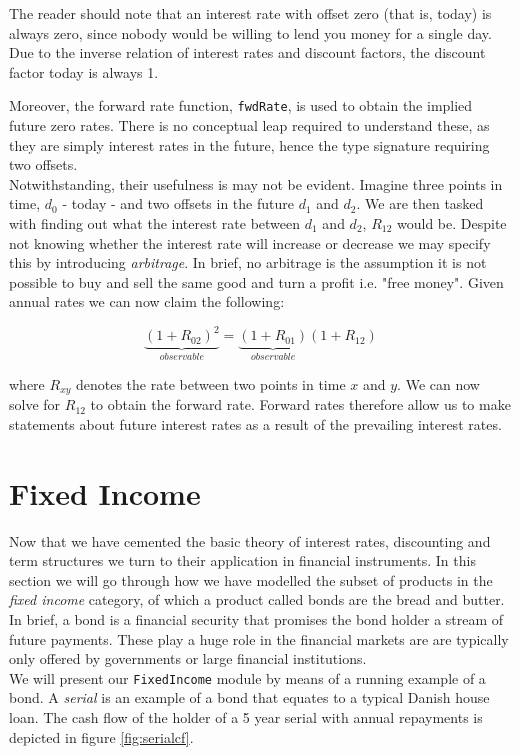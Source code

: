 The reader should note that an interest rate with offset zero (that is, today) is
always zero, since nobody would be willing to lend you money for a single day.
Due to the inverse relation of interest rates and discount factors, the discount factor
today is always 1.

Moreover, the forward rate function, \texttt{fwdRate}, is used to obtain the 
implied future zero rates. There is no conceptual leap required to understand 
these, as they are simply interest rates in the future, hence the type 
signature requiring two offsets.\\
Notwithstanding, their usefulness is may not be evident. 
Imagine three points in time, $d_0$ - today - and two
offsets in the future $d_1$ and $d_2$. We are then tasked with finding out
what the interest rate between $d_1$ and $d_2$, $R_{12}$ would be. Despite not 
knowing whether the interest rate will increase or decrease we may specify 
this by introducing \emph{arbitrage}. In brief, no arbitrage is the
assumption it is not possible to buy and sell the same good and turn a
profit i.e. "free money". Given annual rates we can now claim the following:

\begin{equation}
\underbrace{(1+R_{02})^2}_{observable} = \underbrace{(1+R_{01})}_{observable}(1 + R_{12})
\end{equation}

where $R_{xy}$ denotes the rate between two points in time $x$ and $y$. We
can now solve for $R_{12}$ to obtain the forward rate. Forward rates therefore
allow us to make statements about future interest rates as a result of the
prevailing interest rates.


\section{Fixed Income}\label{sec:fi}

Now that we have cemented the basic theory of interest rates, discounting
and term structures we turn to their application in financial instruments.
In this section we will go through how we have modelled the subset of products 
in the \emph{fixed income} category, of which a product called bonds are 
the bread and butter. In brief, a bond is a financial security that promises
the bond holder a stream of future payments. These play a huge role in the 
financial markets are are typically only offered by governments or large 
financial institutions.\\
We will present our \texttt{FixedIncome} module by means of a running example
of a bond.  A \emph{serial} is an example of a bond that equates to a typical 
Danish house loan. The cash flow of the holder of a 5 year serial with annual 
repayments is depicted in figure \ref{fig:serialcf}.\\

